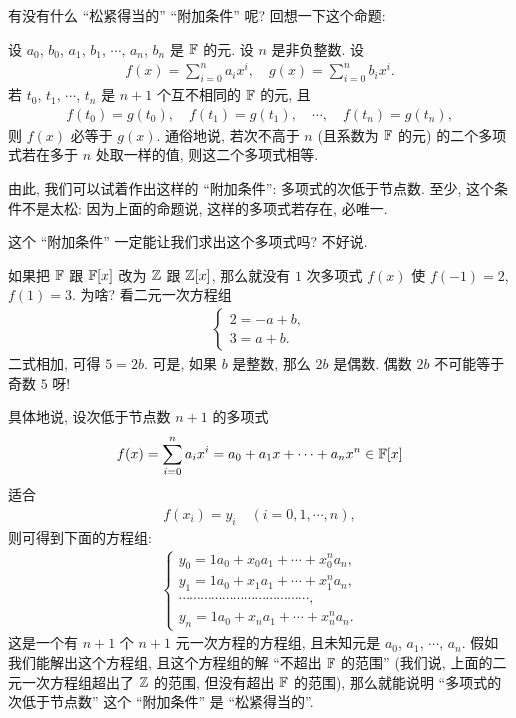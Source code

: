 有没有什么 ``松紧得当的'' ``附加条件'' 呢? 回想一下这个命题:

\begin{proposition}
    设 $a_0$, $b_0$, $a_1$, $b_1$, $\cdots$, $a_n$, $b_n$ 是 $\mathbb{F}$ 的元. 设 $n$ 是非负整数. 设
    \begin{align*}
        f(x) = \sum_{i = 0}^n a_i x^i, \quad g(x) = \sum_{i = 0}^n b_i x^i.
    \end{align*}
    若 $t_0$, $t_1$, $\cdots$, $t_n$ 是 $n+1$ 个互不相同的 $\mathbb{F}$ 的元, 且
    \begin{align*}
        f(t_0) = g(t_0), \quad f(t_1) = g(t_1), \quad \cdots, \quad f(t_n) = g(t_n),
    \end{align*}
    则 $f(x)$ 必等于 $g(x)$. 通俗地说, 若次不高于 $n$ (且系数为 $\mathbb{F}$ 的元) 的二个多项式若在多于 $n$ 处取一样的值, 则这二个多项式相等.
\end{proposition}

由此, 我们可以试着作出这样的 ``附加条件'': 多项式的次低于节点数. 至少, 这个条件不是太松: 因为上面的命题说, 这样的多项式若存在, 必唯一.

这个 ``附加条件'' 一定能让我们求出这个多项式吗? 不好说.

\begin{example}
    如果把 $\mathbb{F}$ 跟 $\mathbb{F}[x]$ 改为 $\mathbb{Z}$ 跟 $\mathbb{Z}[x]$, 那么就没有 $1$ 次多项式 $f(x)$ 使 $f(-1)=2$, $f(1)=3$. 为啥? 看二元一次方程组
    \begin{align*}
        \begin{cases}
            2 = -a + b, \\
            3 = a + b.
        \end{cases}
    \end{align*}
    二式相加, 可得 $5 = 2b$. 可是, 如果 $b$ 是整数, 那么 $2b$ 是偶数. 偶数 $2b$ 不可能等于奇数 $5$ 呀!
\end{example}

具体地说, 设次低于节点数 $n+1$ 的多项式
\begin{align*}
    f(x) = \sum_{i=0}^n a_i x^i = a_0 + a_1 x + \cdots + a_n x^n \in \mathbb{F}[x]
\end{align*}
适合
\begin{align*}
    f(x_i) = y_i \quad (i = 0,1,\cdots,n),
\end{align*}
则可得到下面的方程组:
\begin{align*}
    \begin{cases}
        y_0 = 1 a_0 + x_0 a_1 + \cdots + x_0^n a_n, \\
        y_1 = 1 a_0 + x_1 a_1 + \cdots + x_1^n a_n, \\
        \cdots \cdots \cdots \cdots \cdots \cdots \cdots \cdots
        \cdots \cdots \cdots \cdots,                \\
        y_n = 1 a_0 + x_n a_1 + \cdots + x_n^n a_n.
    \end{cases}
\end{align*}
这是一个有 $n+1$ 个 $n+1$ 元一次方程的方程组, 且未知元是 $a_0$, $a_1$, $\cdots$, $a_n$. 假如我们能解出这个方程组, 且这个方程组的解 ``不超出 $\mathbb{F}$ 的范围'' (我们说, 上面的二元一次方程组超出了 $\mathbb{Z}$ 的范围, 但没有超出 $\mathbb{F}$ 的范围), 那么就能说明 ``多项式的次低于节点数'' 这个 ``附加条件'' 是 ``松紧得当的''.

